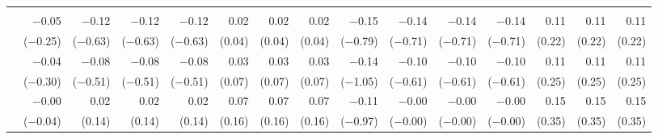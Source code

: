 \begin{tabularx}{1.45\textwidth}{lRRRRRRRRRRRRRR}
		\midrule
		 \\[\panelspacing]
		 & \num{-0.05}\phantom{***)} & \num{-0.12}\phantom{***)} & \num{-0.12}\phantom{***)} & \num{-0.12}\phantom{***)} & \num{0.02}\phantom{***)} & \num{0.02}\phantom{***)} & \num{0.02}\phantom{***)} & \num{-0.15}\phantom{***)} & \num{-0.14}\phantom{***)} & \num{-0.14}\phantom{***)} & \num{-0.14}\phantom{***)} & \num{0.11}\phantom{***)} & \num{0.11}\phantom{***)} & \num{0.11}\phantom{***)} \\
		 & (\num{-0.25})\phantom{***} & (\num{-0.63})\phantom{***} & (\num{-0.63})\phantom{***} & (\num{-0.63})\phantom{***} & (\num{0.04})\phantom{***} & (\num{0.04})\phantom{***} & (\num{0.04})\phantom{***} & (\num{-0.79})\phantom{***} & (\num{-0.71})\phantom{***} & (\num{-0.71})\phantom{***} & (\num{-0.71})\phantom{***} & (\num{0.22})\phantom{***} & (\num{0.22})\phantom{***} & (\num{0.22})\phantom{***} \\ [\dspacing]
		 & \num{-0.04}\phantom{***)} & \num{-0.08}\phantom{***)} & \num{-0.08}\phantom{***)} & \num{-0.08}\phantom{***)} & \num{0.03}\phantom{***)} & \num{0.03}\phantom{***)} & \num{0.03}\phantom{***)} & \num{-0.14}\phantom{***)} & \num{-0.10}\phantom{***)} & \num{-0.10}\phantom{***)} & \num{-0.10}\phantom{***)} & \num{0.11}\phantom{***)} & \num{0.11}\phantom{***)} & \num{0.11}\phantom{***)} \\
		 & (\num{-0.30})\phantom{***} & (\num{-0.51})\phantom{***} & (\num{-0.51})\phantom{***} & (\num{-0.51})\phantom{***} & (\num{0.07})\phantom{***} & (\num{0.07})\phantom{***} & (\num{0.07})\phantom{***} & (\num{-1.05})\phantom{***} & (\num{-0.61})\phantom{***} & (\num{-0.61})\phantom{***} & (\num{-0.61})\phantom{***} & (\num{0.25})\phantom{***} & (\num{0.25})\phantom{***} & (\num{0.25})\phantom{***} \\ [\dspacing]
		 & \num{-0.00}\phantom{***)} & \num{0.02}\phantom{***)} & \num{0.02}\phantom{***)} & \num{0.02}\phantom{***)} & \num{0.07}\phantom{***)} & \num{0.07}\phantom{***)} & \num{0.07}\phantom{***)} & \num{-0.11}\phantom{***)} & \num{-0.00}\phantom{***)} & \num{-0.00}\phantom{***)} & \num{-0.00}\phantom{***)} & \num{0.15}\phantom{***)} & \num{0.15}\phantom{***)} & \num{0.15}\phantom{***)} \\
		 & (\num{-0.04})\phantom{***} & (\num{0.14})\phantom{***} & (\num{0.14})\phantom{***} & (\num{0.14})\phantom{***} & (\num{0.16})\phantom{***} & (\num{0.16})\phantom{***} & (\num{0.16})\phantom{***} & (\num{-0.97})\phantom{***} & (\num{-0.00})\phantom{***} & (\num{-0.00})\phantom{***} & (\num{-0.00})\phantom{***} & (\num{0.35})\phantom{***} & (\num{0.35})\phantom{***} & (\num{0.35})\phantom{***} \\ [\dspacing]

\end{tabularx}
